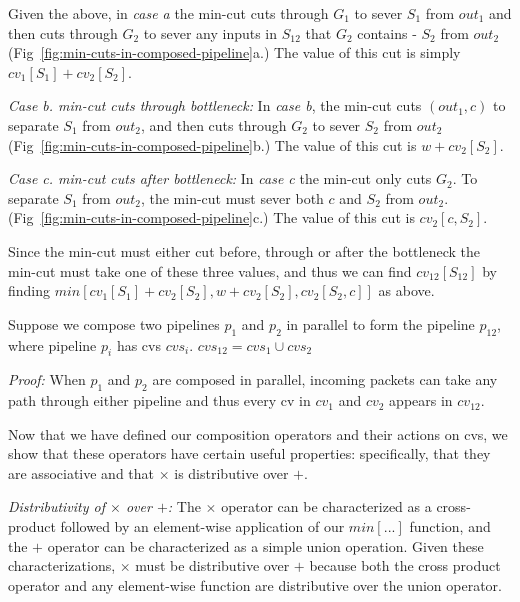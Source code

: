 Given the above, in \textit{case a} the min-cut cuts through $G_1$ to sever $S_1$ from $out_1$ and then cuts through $G_2$ to sever any inputs in $S_{12}$ that $G_2$ contains - $S_2$ from $out_2$ (Fig~\ref{fig:min-cuts-in-composed-pipeline}a.) The value of this cut is simply $cv_1[S_1] + cv_2[S_2]$.

\vspace{3mm}
\textit{Case b. min-cut cuts through bottleneck:} In \textit{case b}, the min-cut cuts $(out_1, c)$ to separate $S_1$ from $out_2$, and then cuts through $G_2$ to sever $S_2$ from $out_2$ (Fig~\ref{fig:min-cuts-in-composed-pipeline}b.) The value of this cut is $w + cv_2[S_2]$.

\vspace{3mm}
\textit{Case c. min-cut cuts after bottleneck:} In \textit{case c} the min-cut only cuts $G_2$. To separate $S_1$ from $out_2$, the min-cut must sever both $c$ and $S_2$ from $out_2$. (Fig~\ref{fig:min-cuts-in-composed-pipeline}c.) The value of this cut is $cv_2[c, S_2]$.

\vspace{3mm}
Since the min-cut must either cut before, through or after the bottleneck the min-cut must take one of these three values, and thus we can find $cv_{12}[S_{12}]$ by finding $min[cv_1[S_1] + cv_2[S_2], w + cv_2[S_2], cv_2[S_2, c]]$ as above.

 Suppose we compose two pipelines $p_1$ and $p_2$ in parallel to form the pipeline $p_{12}$, where pipeline $p_i$ has cvs $cvs_i$. $cvs_{12} = cvs_1 \cup cvs_2$

\vspace{3mm}
\textit{Proof:} When $p_1$ and $p_2$ are composed in parallel, incoming packets can take any path through either pipeline and thus every cv in $cv_1$ and $cv_2$ appears in $cv_{12}$.

 Now that we have defined our composition operators and their actions on cvs, we show that these operators have certain useful properties: specifically, that they are associative and that $\times$ is distributive over $+$.

\vspace{3mm}
\textit{Distributivity of $\times$ over $+$:} The $\times$ operator can be characterized as a cross-product followed by an element-wise application of our $min[...]$ function, and the $+$ operator can be characterized as a simple union operation. Given these characterizations, $\times$ must be distributive over $+$ because both the cross product operator and any element-wise function are distributive over the union operator.

